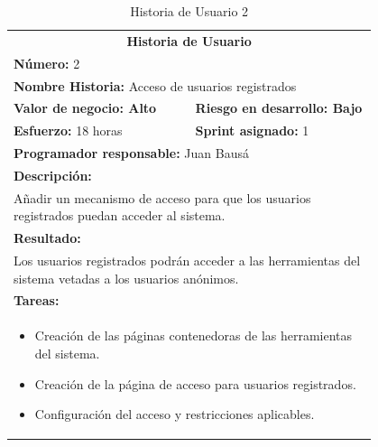 	\begin{table}[H]
	  \centering 
	  \begin{tabular}{p{0.4\linewidth}p{0.4\linewidth}}
	    \toprule
	    \multicolumn{2}{c}{\cellcolor{black!30}\textbf{Historia de Usuario}} 													\\
		\multicolumn{2}{l}{\cellcolor{gray!25}\textbf{Número: }2}																\\
		\multicolumn{2}{l}{\textbf{Nombre Historia: } Acceso de usuarios registrados}													\\
		\cellcolor{gray!25}\textbf{Valor de negocio: Alto}	&	\cellcolor{gray!25}\textbf{Riesgo en desarrollo: Bajo}			\\
		\textbf{Esfuerzo:} 18 horas				&	\textbf{Sprint asignado: }1 												\\
		\multicolumn{2}{l}{\cellcolor{gray!25}\textbf{Programador responsable: }Juan Bausá}									\\
		\multicolumn{2}{l}{\textbf{Descripción:}}                                                     						\\
		\multicolumn{2}{l}{\parbox{15cm}{Añadir un mecanismo de acceso para que los usuarios registrados puedan acceder al sistema.}}	\\
		\multicolumn{2}{l}{\cellcolor{gray!25}\textbf{Resultado:}}																\\
		\multicolumn{2}{l}{\parbox{15cm}{Los usuarios registrados podrán acceder a las herramientas del sistema vetadas a los usuarios anónimos.}} 						\\
		\multicolumn{2}{l}{\textbf{Tareas:}}																					\\
		\multicolumn{2}{l}{
			\begin{minipage}{5in}
	    		\vskip 4pt
	    		\begin{itemize}
	    			\item Creación de las páginas contenedoras de las herramientas del sistema.
	    			\item Creación de la página de acceso para usuarios registrados.
					\item Configuración del acceso y restricciones aplicables.
				\end{itemize}
			  	\vskip 4pt
		 	\end{minipage}
		} \\																				
	    \hline
	  \end{tabular}
	  \caption{Historia de Usuario 2}
	\end{table}
	
